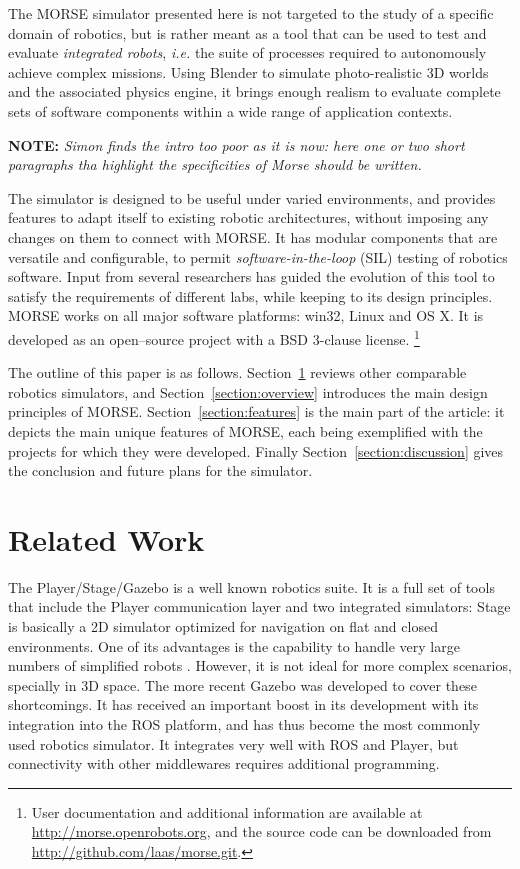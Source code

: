 \documentclass{llncs}
\newcommand{\NOTE}[1]{\textbf{NOTE:} \emph{#1} }
\begin{document}
The MORSE simulator presented here is not targeted to the study of a specific
domain of robotics, but is rather meant as a tool that can be used to test and
evaluate {\em integrated robots}, {\em i.e.} the suite of processes required to
autonomously achieve complex missions. Using Blender to simulate photo-realistic
3D worlds and the associated physics engine, it brings enough realism to evaluate
complete sets of software components within a wide range of application contexts.

\NOTE{Simon finds the intro too poor as it is now: here one or two short
  paragraphs tha highlight the specificities of Morse should be written.}

The simulator is designed to be useful under varied environments, and provides
features to adapt itself to existing robotic architectures, without imposing
any changes on them to connect with MORSE. It has modular components
that are versatile and configurable, to permit \emph{software-in-the-loop}
(SIL) testing of robotics software.  Input from several researchers has guided
the evolution of this tool to satisfy the requirements of different labs, while
keeping to its design principles.
MORSE works on all major software platforms: win32, Linux and OS X. It is
developed as an open--source project with a BSD 3-clause license.
\footnote{User documentation and additional information are available at
\url{http://morse.openrobots.org}, and the source code can be downloaded from
\url{http://github.com/laas/morse.git}.} 

The outline of this paper is as follows. Section~\ref{section:othersims} reviews
other comparable robotics simulators, and Section~\ref{section:overview}
introduces the main design principles of MORSE. Section~\ref{section:features}
is the main part of the article: it depicts the main unique features of MORSE,
each being exemplified with the projects for which they were developed. Finally
Section~\ref{section:discussion} gives the conclusion and future plans for the
simulator.

\section{Related Work}
\label{section:othersims}

The Player/Stage/Gazebo\cite{psg-1232} is a well known robotics suite.
It is a full set of tools that include the Player communication layer
and two integrated simulators: Stage \cite{Gerkey03theplayer/stage} is basically a
2D simulator optimized for navigation on flat and closed environments.
One of its advantages is the capability to handle very large numbers of
simplified robots \cite{springerlink:10.1007/s11721-008-0014-4}. However, it is
not ideal for more complex scenarios, specially in 3D space. The more recent
Gazebo \cite{Koenig04designand} was developed to cover these shortcomings.
It has received an important boost in its development with its integration
into the ROS platform, and has thus become the most commonly used robotics
simulator. It integrates very well with ROS and Player, but connectivity with
other middlewares requires additional programming.
\end{document}
